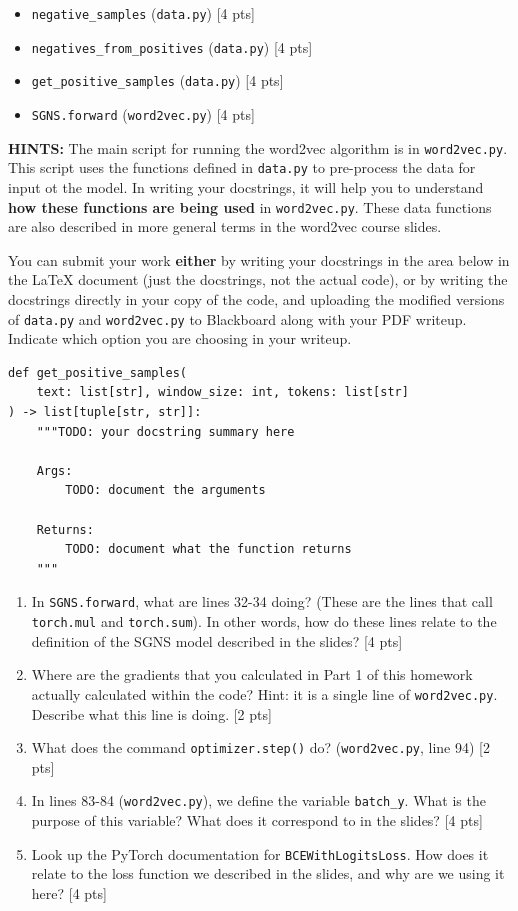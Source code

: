 \documentclass[11pt]{article}
\begin{document}
\begin{itemize}
  \item \texttt{negative\_samples} (\texttt{data.py}) [4 pts]
  \item \texttt{negatives\_from\_positives} (\texttt{data.py}) [4 pts]
  \item \texttt{get\_positive\_samples} (\texttt{data.py}) [4 pts]
  \item \texttt{SGNS.forward} (\texttt{word2vec.py}) [4 pts]
\end{itemize}

\textbf{HINTS:} The main script for running the word2vec algorithm is in \texttt{word2vec.py}. This script uses the functions defined in \texttt{data.py} to pre-process the data for input ot the model. In writing your docstrings, it will help you to understand \textbf{how these functions are being used} in \texttt{word2vec.py}. These data functions are also described in more general terms in the word2vec course slides.

You can submit your work \textbf{either} by writing your docstrings in the area below in the LaTeX document (just the docstrings, not the actual code), or by writing the docstrings directly in your copy of the code, and uploading the modified versions of \texttt{data.py} and \texttt{word2vec.py} to Blackboard along with your PDF writeup. Indicate which option you are choosing in your writeup.

\begin{lstlisting}
def get_positive_samples(
    text: list[str], window_size: int, tokens: list[str]
) -> list[tuple[str, str]]:
    """TODO: your docstring summary here

    Args:
        TODO: document the arguments

    Returns:
        TODO: document what the function returns
    """
\end{lstlisting}

\vspace{2em}
\begin{enumerate}[label=\alph*.]
  \item In \texttt{SGNS.forward}, what are lines 32-34 doing? (These are the lines that call \texttt{torch.mul} and \texttt{torch.sum}). In other words, how do these lines relate to the definition of the SGNS model described in the slides? [4 pts]
  \item Where are the gradients that you calculated in Part 1 of this homework actually calculated within the code? Hint: it is a single line of \texttt{word2vec.py}. Describe what this line is doing. [2 pts]
  \item What does the command \texttt{optimizer.step()} do? (\texttt{word2vec.py}, line 94) [2 pts]
  \item In lines 83-84 (\texttt{word2vec.py}), we define the variable \texttt{batch\_y}. What is the purpose of this variable? What does it correspond to in the slides? [4 pts]
  \item Look up the PyTorch documentation for \texttt{BCEWithLogitsLoss}. How does it relate to the loss function we described in the slides, and why are we using it here? [4 pts]
\end{enumerate}
\end{document}
